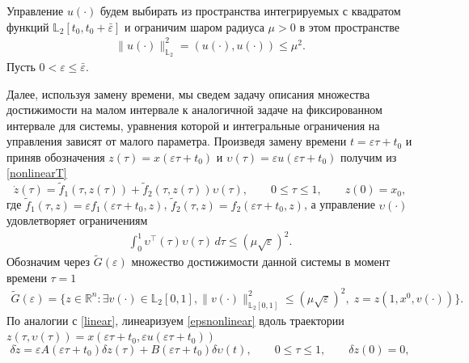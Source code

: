 \documentclass[../main.tex]{subfiles}
\begin{document}
     Управление $u(\cdot)$ будем выбирать из
    пространства интегрируемых с квадратом функций $\mathbb{L}_2[t_0,t_0+\bar{\varepsilon}]$ и ограничим шаром радиуса $ \mu > 0 $ в этом пространстве
    \begin{gather*}
    	\lVert u(\cdot)\rVert^2_{\mathbb{L}_2} = \left(u(\cdot),u(\cdot) \right) \leqslant \mu^2.
    \end{gather*}
	Пусть $ 0 <  \varepsilon \leqslant \bar{\varepsilon} $.  
	
	Далее, используя замену времени, мы сведем задачу описания множества достижимости на малом интервале к аналогичной задаче на фиксированном интервале для системы, уравнения которой и интегральные ограничения на управления зависят от малого параметра.
    Произведя замену времени
    $ t = \varepsilon \tau + t_0 $ и приняв обозначения $ z(\tau) = x(\varepsilon \tau + t_0) $ и $ \upsilon(\tau) = \varepsilon u(\varepsilon \tau + t_0) $  получим из \eqref{nonlinearT}
        \begin{equation}\label{epsnonlinear}
    	\dot{z}(\tau)=\widetilde{f}_1(\tau,z(\tau))+\widetilde{f}_2(\tau,z(\tau))\upsilon(\tau), \qquad 0 \leqslant \tau \leqslant 1, \qquad z(0) = x_0,
    \end{equation}
    где $ \widetilde{f}_1(\tau,z) = \varepsilon f_1(\varepsilon \tau + t_0,z) $, $ \widetilde{f}_2 (\tau,z) = f_2(\varepsilon \tau + t_0,z)$, а управление $ \upsilon(\cdot) $ удовлетворяет ограничениям
    \begin{gather}\label{epscond}
    	\int_0^1 \upsilon^{\top}(\tau) \upsilon(\tau) \, d\tau \leqslant \left( \mu \sqrt{\varepsilon}\right)^2.
    \end{gather}
    Обозначим через $\widetilde{G}(\varepsilon)$ множество достижимости данной системы в момент времени $\tau=1$
    \begin{gather*}
    	\widetilde{G}(\varepsilon)=\{z\in \mathbb{R}^n:\exists v(\cdot)\in \mathbb{L}_2[0,1],  \lVert v(\cdot)\rVert^2_{\mathbb{L}_2[0,1]}
    	\leqslant \left( \mu \sqrt{\varepsilon}\right)^2, \; z=z(1,x^0,v(\cdot))\}.
    \end{gather*}
    По аналогии с \eqref{linear}, линеаризуем \eqref{epsnonlinear} вдоль траектории $ z(\tau,\upsilon(\tau)) = x(\varepsilon \tau + t_0,\varepsilon u(\varepsilon \tau + t_0)) $
    \begin{equation}\label{epslinear}
    	\delta\dot{z} = \varepsilon A(\varepsilon \tau + t_0)\delta z(\tau) + B(\varepsilon \tau + t_0)\delta \upsilon(t),\qquad 0 \leqslant \tau \leqslant 1, \qquad \delta z(0) = 0,
    \end{equation}
\end{document}
